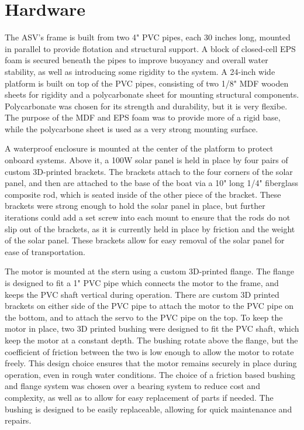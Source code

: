 \section{Hardware}

The ASV's frame is built from two 4" PVC pipes, each 30 inches long, mounted in parallel to provide flotation and structural support. A block of closed-cell EPS foam is secured beneath the pipes to improve buoyancy and overall water stability, as well as introducing some rigidity to the system. A 24-inch wide platform is built on top of the PVC pipes, consisting of two 1/8" MDF wooden sheets for rigidity and a polycarbonate sheet for mounting structural components. Polycarbonate was chosen for its strength and durability, but it is very flexibe. The purpose of the MDF and EPS foam was to provide more of a rigid base, while the polycarbone sheet is used as a very strong mounting surface. 

A waterproof enclosure is mounted at the center of the platform to protect onboard systems. Above it, a 100W solar panel is held in place by four pairs of custom 3D-printed brackets. The brackets attach to the four corners of the solar panel, and then are attached to the base of the boat via a 10" long 1/4" fiberglass composite rod, which is seated inside of the other piece of the bracket. These brackets were strong enough to hold the solar panel in place, but further iterations could add a set screw into each mount to ensure that the rods do not slip out of the brackets, as it is currently held in place by friction and the weight of the solar panel. These brackets allow for easy removal of the solar panel for ease of transportation.

The motor is mounted at the stern using a custom 3D-printed flange. The flange is designed to fit a 1" PVC pipe which connects the motor to the frame, and keeps the PVC shaft vertical during operation. There are custom 3D printed brackets on either side of the PVC pipe to attach the motor to the PVC pipe on the bottom, and to attach the servo to the PVC pipe on the top. To keep the motor in place, two 3D printed bushing were designed to fit the PVC shaft, which keep the motor at a constant depth. The bushing rotate above the flange, but the coefficient of friction between the two is low enough to allow the motor to rotate freely. This design choice ensures that the motor remains securely in place during operation, even in rough water conditions. The choice of a friction based bushing and flange system was chosen over a bearing system to reduce cost and complexity, as well as to allow for easy replacement of parts if needed. The bushing is designed to be easily replaceable, allowing for quick maintenance and repairs.

